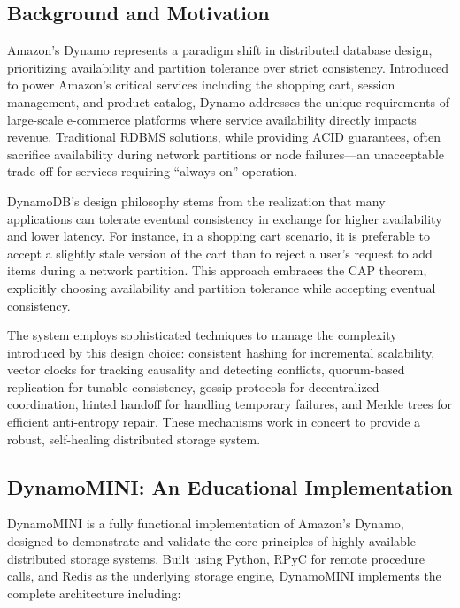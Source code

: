 \documentclass[conference]{IEEEtran}
\begin{document}
\subsection{Background and Motivation}
Amazon's Dynamo represents a paradigm shift in distributed database design, prioritizing availability and partition tolerance over strict consistency. Introduced to power Amazon's critical services including the shopping cart, session management, and product catalog, Dynamo addresses the unique requirements of large-scale e-commerce platforms where service availability directly impacts revenue. Traditional RDBMS solutions, while providing ACID guarantees, often sacrifice availability during network partitions or node failures—an unacceptable trade-off for services requiring ``always-on'' operation.

DynamoDB's design philosophy stems from the realization that many applications can tolerate eventual consistency in exchange for higher availability and lower latency. For instance, in a shopping cart scenario, it is preferable to accept a slightly stale version of the cart than to reject a user's request to add items during a network partition. This approach embraces the CAP theorem, explicitly choosing availability and partition tolerance while accepting eventual consistency.

The system employs sophisticated techniques to manage the complexity introduced by this design choice: consistent hashing for incremental scalability, vector clocks for tracking causality and detecting conflicts, quorum-based replication for tunable consistency, gossip protocols for decentralized coordination, hinted handoff for handling temporary failures, and Merkle trees for efficient anti-entropy repair. These mechanisms work in concert to provide a robust, self-healing distributed storage system.

\subsection{DynamoMINI: An Educational Implementation}
DynamoMINI is a fully functional implementation of Amazon's Dynamo, designed to demonstrate and validate the core principles of highly available distributed storage systems. Built using Python, RPyC for remote procedure calls, and Redis as the underlying storage engine, DynamoMINI implements the complete architecture including:
\end{document}
